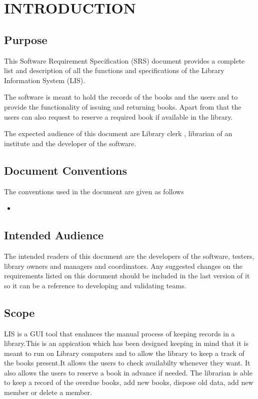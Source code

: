 \documentclass{article}
\begin{document}

\section{INTRODUCTION}

\subsection{Purpose}
This Software Requirement Specification (SRS) document provides a complete list and description of all the functions and specifications of the Library Information System (LIS).

The software is meant to hold the records of the books and the users and to provide the functionality of issuing and returning books. Apart from that the users can also request to reserve a required book if available in the library.

The expected audience of this document are Library clerk , librarian of an institute and the developer of the software.

\subsection{Document Conventions}
The conventions used in the document are given as follows
\begin{itemize}
\item 
\end{itemize}
\subsection{Intended Audience}
The intended readers of this document are the developers of the software, testers, library owners
and managers and coordinators.
Any suggested changes on the requirements listed on this document should be included in
the last version of it so it can be a reference to developing and validating teams.
\subsection{Scope}
LIS is a GUI tool that enahnces the manual process of keeping records in a library.This is an appication which has been designed keeping in mind that it is meant to run on Library computers and to allow the library to keep a track of the books present.It allows the users to check availabilty whenever they want. It also allows the users to reserve a book in advance if needed. The librarian is able to keep a record of the overdue books, add new books, dispose old data, add new member or delete a member. 
\end{document}
